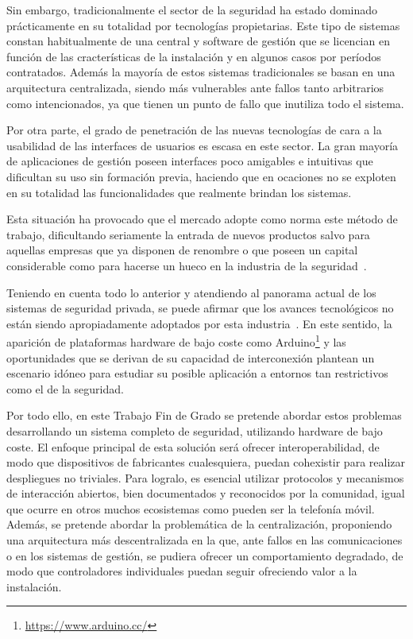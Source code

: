 \documentclass{pre-tfg}
\begin{document}
Sin embargo, tradicionalmente el sector de la seguridad ha estado dominado prácticamente en su totalidad por tecnologías propietarias. Este tipo de sistemas constan habitualmente de una central y software de gestión que se licencian en función de las cracterísticas de la instalación y en algunos casos por períodos contratados. Además la mayoría de estos sistemas tradicionales se basan en una arquitectura centralizada, siendo más vulnerables ante fallos tanto arbitrarios como intencionados, ya que tienen un punto de fallo que inutiliza todo el sistema. 

Por otra parte, el grado de penetración de las nuevas tecnologías de cara a la usabilidad de las interfaces de usuarios es escasa en este sector. La gran mayoría de aplicaciones de gestión poseen interfaces poco amigables e intuitivas que dificultan su uso sin formación previa, haciendo que en ocaciones no se exploten en su totalidad las funcionalidades que realmente brindan los sistemas.

Esta situación ha provocado que el mercado adopte como norma este método de trabajo, dificultando seriamente la entrada de nuevos productos salvo para aquellas empresas que ya disponen de renombre o que poseen un capital considerable como para hacerse un hueco en la industria de la seguridad~\cite{garc2007hesperia}.

Teniendo en cuenta todo lo anterior y atendiendo al panorama actual de los sistemas de seguridad privada, se puede afirmar que los avances tecnológicos no están siendo apropiadamente adoptados por esta industria~\cite{PPavan2015}. En este sentido, la aparición de plataformas hardware de bajo coste como Arduino\footnote{\url{https://www.arduino.cc/}} y las oportunidades que se derivan de su capacidad de interconexión plantean un escenario idóneo para estudiar su posible aplicación a entornos tan restrictivos como el de la seguridad.  

Por todo ello, en este Trabajo Fin de Grado se pretende abordar estos problemas desarrollando un sistema completo de seguridad, utilizando hardware de bajo coste. El enfoque principal de esta solución será ofrecer interoperabilidad, de modo que dispositivos de fabricantes cualesquiera, puedan cohexistir para realizar despliegues no triviales. Para logralo, es esencial utilizar protocolos y mecanismos de interacción abiertos, bien documentados y reconocidos por la comunidad, igual que ocurre en otros muchos ecosistemas como pueden ser la telefonía móvil. Además, se pretende abordar la problemática de la centralización, proponiendo una arquitectura más descentralizada en la que, ante fallos en las comunicaciones o en los sistemas de gestión, se pudiera ofrecer un comportamiento degradado, de modo que controladores individuales puedan seguir ofreciendo valor a la instalación.
\end{document}
